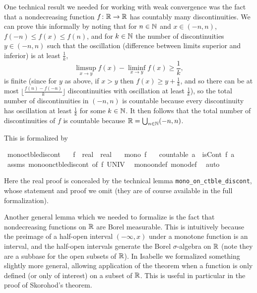 \documentclass{article}
\theoremstyle{definition}
\begin{document}
One technical result we needed for working with weak convergence was the fact that a nondecreasing function $f\colon \mathbb{R} \rightarrow \mathbb{R}$ has countably many discontinuities. We can prove this informally by noting that for $n \in \mathbb{N}$ and $x \in (-n,n)$, $f(-n) \le f(x) \le f(n)$, and for $k \in \mathbb{N}$ the number of discontinuities $y \in (-n,n)$ such that the oscillation (difference between limits superior and inferior) is at least $\frac{1}{k}$, 
\[ \limsup_{x \rightarrow y} f(x) - \liminf_{x \rightarrow y} f(x) \ge \frac{1}{k}, \]
is finite (since for $y$ as above, if $x > y$ then $f(x) \ge y + \frac{1}{k}$, and so there can be at most $\lfloor \frac{f(n) - f(-n)}{k} \rfloor$ discontinuities with oscillation at least $\frac{1}{k}$), so the total number of discontinuities in $(-n,n)$ is countable because every discontinuity has oscillation at least $\frac{1}{k}$ for some $k \in \mathbb{N}$. It then follows that the total number of discontinuities of $f$ is countable because $\mathbb{R} = \bigcup_{n \in \mathbb{N}} (-n,n)$.

This is formalized by

\medskip

\begin{isabellebody}
\isamarkupfalse%
\ mono{\isacharunderscore}ctble{\isacharunderscore}discont{\isacharcolon}\isanewline
\ \ \ f\ {\isacharcolon}{\isacharcolon}\ {\isachardoublequoteopen}real\ {\isasymRightarrow}\ real{\isachardoublequoteclose}\isanewline
\ \ \ {\isachardoublequoteopen}mono\ f{\isachardoublequoteclose}\isanewline
\ \ \ {\isachardoublequoteopen}countable\ {\isacharbraceleft}a{\isachardot}\ {\isasymnot}\ isCont\ f\ a{\isacharbraceright}{\isachardoublequoteclose}\isanewline
{}\isamarkupfalse%
\ assms\ mono{\isacharunderscore}on{\isacharunderscore}ctble{\isacharunderscore}discont\ {\isacharbrackleft}of\ f\ UNIV{\isacharbrackright}\ \isamarkupfalse%
\ mono{\isacharunderscore}on{\isacharunderscore}def\ mono{\isacharunderscore}def\ \isamarkupfalse%
\ auto%
\end{isabellebody}

\medskip

Here the real proof is concealed by the technical lemma \texttt{mono\_on\_ctble\_discont}, whose statement and proof we omit (they are of course available in the full formalization).

Another general lemma which we needed to formalize is the fact that nondecreasing functions on $\mathbb{R}$ are Borel measurable. This is intuitively because the preimage of a half-open interval $(-\infty,x)$ under a monotone function is an interval, and the half-open intervals generate the Borel $\sigma$-algebra on $\mathbb{R}$ (note they are a subbase for the open subsets of $\mathbb{R}$). In Isabelle we formalized something slightly more general, allowing application of the theorem when a function is only defined (or only of interest) on a subset of $\mathbb{R}$. This is useful in particular in the proof of Skorohod's theorem.
\end{document}
